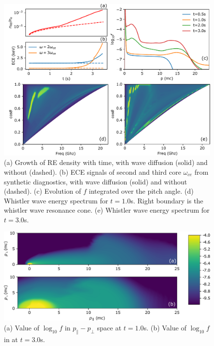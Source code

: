 \documentclass[aps, prl, preprint,english,superscriptaddress]{revtex4-1}
\begin{document}
\begin{figure}[h]
	\begin{center}
		\includegraphics[width=0.9\linewidth]{ECE-before}
	\end{center}
	\caption{\label{fig:before}(a) Growth of RE density
	 with time, with wave diffusion (solid) and without (dashed). (b) ECE signals of second and third core $\omega_{ce}$ from synthetic diagnostics, with wave diffusion (solid) and without (dashed). (c) Evolution of $f$ integrated over the pitch angle. (d) Whistler wave energy spectrum for $t=1.0$s. Right boundary is the whistler wave resonance cone. (e) Whistler wave energy spectrum for $t=3.0$s.}
\end{figure}

\begin{figure}[h]
	\begin{center}
		\includegraphics[width=0.8\linewidth]{f2d-1}
	\end{center}
	\caption{\label{fig:f2d} (a) Value of $\log_{10}f$ in $p_{\parallel}-p_{\perp}$ space at $t=1.0$s. (b) Value of $\log_{10}f$ in at $t=3.0$s.}
\end{figure}
\end{document}
